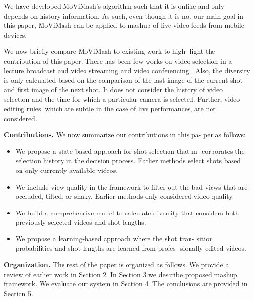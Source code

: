 \documentclass{sig-alternate}
\begin{document}
We have developed MoViMash’s algorithm such that it is online
and only depends on history information. As such, even though
it is not our main goal in this paper, MoViMash can be applied to
mashup of live video feeds from mobile devices.

We now briefly compare MoViMash to existing work to high-
light the contribution of this paper. There has been few works on
video selection in a lecture broadcast and video streaming \cite{21} \cite{6}
and video conferencing \cite{3}. Also, the diversity is
only calculated based on the comparison of the last image of the
current shot and first image of the next shot. It does not consider
the history of video selection and the time for which a particular
camera is selected. Further, video editing rules, which are subtle in
the case of live performances, are not considered.

\textbf{Contributions. }We now summarize our contributions in this pa-
per as follows:
\begin{itemize}
    \item We propose a state-based approach for shot selection that in-
corporates the selection history in the decision process. Earlier methods select shots based on only currently available
videos.
    \item We include view quality in the framework to filter out the
bad views that are occluded, tilted, or shaky. Earlier methods
only considered video quality.
    \item We build a comprehensive model to calculate diversity that
considers both previously selected videos and shot lengths.
    \item We propose a learning-based approach where the shot tran-
sition probabilities and shot lengths are learned from profes-
sionally edited videos.
\end{itemize}

\textbf{Organization. }The rest of the paper is organized as follows.
We provide a review of earlier work in Section 2. In Section 3 we
describe proposed mashup framework. We evaluate our system in
Section 4. The conclusions are provided in Section 5.
\end{document}
